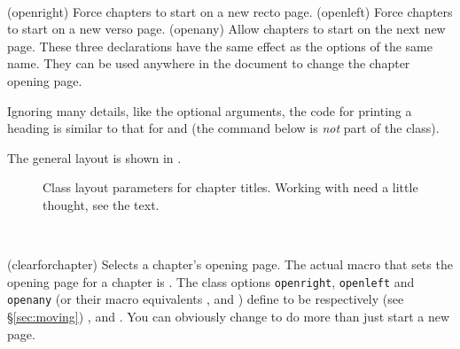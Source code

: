 \begin{syntax}
\cmd{\openright} \cmd{\openleft} \cmd{\openany} \\
\end{syntax}
\glossary(openright)%
  {}%
  {Force chapters to start on a new recto page.}
\glossary(openleft)%
  {}%
  {Force chapters to start on a new verso page.}
\glossary(openany)%
  {}%
  {Allow chapters to start on the next new page.}
These three declarations have the same effect as the options of the same name.
They can be used anywhere in the document to change the chapter opening page.

Ignoring many details, like the optional arguments, the code for 
printing a \cmd{\chapter} heading is similar to that for \cmd{\book} 
and \cmd{\part} (the  command below is \emph{not}
part of the class).
\begin{lcode}
\newcommand{\chapterhead}[1]{ %
  \clearforchapter        %
  \thispagestyle{chapter} %
  \insertchapterspace     %
  \chapterheadstart       %
  \printchaptername\chapternamenum\printchapternum
  \afterchapternum        %
  \printchaptertitle{#1}  %
  \afterchaptertitle}     %
\end{lcode}
The general layout is shown in .

\begin{figure}
\centering
\chapterdiagram
\caption{Class layout parameters for chapter titles. Working with
   need a little thought, see the text.} 
\label{lay:chap}
\end{figure}

\begin{syntax}
\cmd{\clearforchapter} \\
\end{syntax}
\glossary(clearforchapter)%
  {}%
  {Selects a chapter's opening page.}
The actual macro that sets the opening page for a chapter is 
\cmd{\clearforchapter}. The class options \texttt{openright},
\texttt{openleft} and \texttt{openany} (or their macro equivalents
\cmd{\openright}, \cmd{\openleft} and
\cmd{\openany}) define \cmd{\clearforchapter} to be respectively
(see \S\ref{sec:moving}) 
\cmd{\cleartorecto}, \cmd{\cleartoverso} and \cmd{\clearpage}. You can
obviously change \cmd{\clearforchapter} to do more than just start a
new page.

